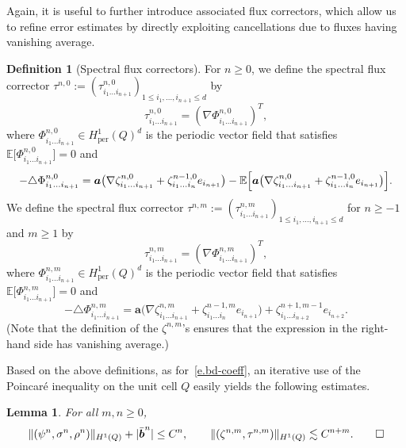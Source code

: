 \documentclass[10pt]{amsart}
\theoremstyle{plain}
\newtheorem{lem0}[theor0]{Lemma}
\newenvironment{lem}
{\renewcommand{\qedsymbol}{$\lozenge$}\pushQED{\qed}\begin{lem0}}
{\popQED\end{lem0}}
\theoremstyle{definition}
\newtheorem{defin0}[theor0]{Definition}
\newenvironment{defin}
{\renewcommand{\qedsymbol}{$\lozenge$}\pushQED{\qed}\begin{defin0}}
{\popQED\end{defin0}}
\numberwithin{equation}{section}
\newcommand{\per}{{\operatorname{per}}}
\newcommand{\ee}{e}
\newcommand{\Aa}{\boldsymbol a}
\newcommand{\bb}{{\boldsymbol b}}
\newcommand{\Bexpec}[1]{\mathbb{E}\Bigl[ #1 \Bigr]}
\newcommand{\expecm}[1]{\mathbb{E}\bigl[ #1 \bigr]}\let\bexpec\expecm
\begin{document}
Again, it is useful to further introduce associated flux correctors, which allow {us} to refine error estimates by directly exploiting cancellations due to fluxes having vanishing average.

\begin{defin}[Spectral flux correctors]\label{def:spec-fluc-corr-zeta}
For $n\ge0$, we define the spectral flux corrector $\tau^{n,0}:=(\tau^{n,0}_{i_1\ldots i_{n+1}})_{1\le i_1,\ldots,i_{n+1}\le d}$ by\vspace*{-3pt}
\[\tau_{i_1\ldots i_{n+1}}^{n,0}=(\nabla\Phi_{i_1\ldots i_{n+1}}^{n,0})^T,\]
where $\Phi^{n,0}_{i_1\ldots i_{n+1}}\in H^1_\per(Q)^d$ is the periodic vector field that satisfies $\expecm{\Phi_{i_1\ldots i_{n+1}}^{n,0}}=0$ and\vspace*{-3pt}
\[-\triangle\Phi^{n,0}_{i_1\ldots i_{n+1}}=\Aa\big(\nabla\zeta^{n,0}_{i_1\ldots i_{n+1}}+\zeta^{n-1,0}_{i_1\ldots i_{n}}\ee_{i_{n+1}}\big)-\Bexpec{\Aa\big(\nabla\zeta^{n,0}_{i_1\ldots i_{n+1}}+\zeta^{n-1,0}_{i_1\ldots i_{n}}\ee_{i_{n+1}}\big)}.\]
We define the spectral flux corrector $\tau^{n,m}:=(\tau^{n,m}_{i_1\ldots i_{n+1}})_{1\le i_1,\ldots,i_{n+1}\le d}$ for $n\ge-1$ and $m\ge1$ by\vspace*{-3pt}
\[\tau_{i_1\ldots i_{n+1}}^{n,m}=(\nabla\Phi_{i_1\ldots i_{n+1}}^{n,m})^T,\]
where $\Phi^{n,m}_{i_1\ldots i_{n+1}}\in H^1_\per(Q)^d$ is the periodic vector field that satisfies $\expecm{\Phi_{i_1\ldots i_{n+1}}^{n,m}}=0$ and\vspace*{-3pt}
\begin{equation*}
-\triangle\Phi^{n,m}_{i_1\ldots i_{n+1}}=\Aa\big(\nabla\zeta^{n,m}_{i_1\ldots i_{n+1}}+\zeta^{n-1,m}_{i_1\ldots i_{n}}\ee_{i_{n+1}}\big)+\zeta_{i_1\ldots i_{n+2}}^{n+1,m-1}\ee_{i_{n+2}}.
\end{equation*}
(Note that the definition of the $\zeta^{n,m}$'s ensures that the expression in the right-hand side has vanishing average.)
\end{defin}

Based on the above definitions, as for~\eqref{e.bd-coeff}, an iterative use of the Poincaré inequality on the unit cell $Q$ easily yields the following estimates.

\begin{lem}\label{lem:cor-est-per}
For all $m,n\ge0$,\vspace*{-3pt}
\begin{equation}\label{eq:cor-est-per}
\|(\psi^n,\sigma^n,\rho^n)\|_{H^1(Q)} +|\bar \bb^n|\le C^n,\qquad \|(\zeta^{n,m},\tau^{n,m})\|_{H^1(Q)}\lesssim C^{n+m}.\qedhere
\end{equation}
\end{lem}
\end{document}
